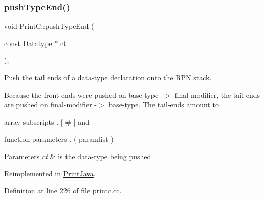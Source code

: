 \subsubsection{\texorpdfstring{pushTypeEnd()}{pushTypeEnd()}}
{\footnotesize\ttfamily void Print\+C\+::push\+Type\+End (\begin{DoxyParamCaption}\item[{const \mbox{\hyperlink{class_datatype}{Datatype}} $\ast$}]{ct }\end{DoxyParamCaption})\hspace{0.3cm}{\ttfamily [protected]}, {\ttfamily [virtual]}}



Push the tail ends of a data-\/type declaration onto the R\+PN stack. 

Because the front-\/ends were pushed on base-\/type -\/$>$ final-\/modifier, the tail-\/ends are pushed on final-\/modifier -\/$>$ base-\/type. The tail-\/ends amount to
\begin{DoxyItemize}
\item array subscripts . \mbox{[} \# \mbox{]} and
\item function parameters . ( paramlist )
\end{DoxyItemize}


\begin{DoxyParams}{Parameters}
{\em ct} & is the data-\/type being pushed \\
\hline
\end{DoxyParams}


Reimplemented in \mbox{\hyperlink{class_print_java_a64718e3b689e9e895f4c6124f8538075}{Print\+Java}}.



Definition at line 226 of file printc.\+cc.

